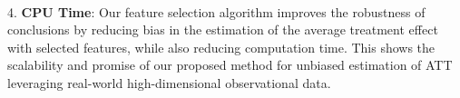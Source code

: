 \\ \hspace*{1em} 4. \textbf{CPU Time}: Our feature selection algorithm improves the robustness of conclusions by reducing bias in the estimation of the average treatment effect with selected features, while also reducing computation time. This shows the scalability and promise of our proposed method for unbiased estimation of ATT leveraging real-world high-dimensional observational data.   



